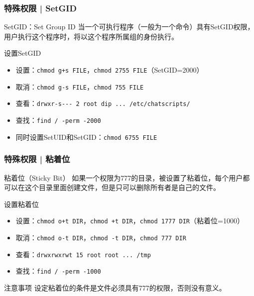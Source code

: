 \begin{frame}[fragile]
  \frametitle{特殊权限 | SetGID}
  \begin{block}{SetGID：Set Group ID}
    当一个可执行程序（一般为一个命令）具有SetGID权限，用户执行这个程序时，将以这个程序所属组的身份执行。
  \end{block}
  \pause
  \begin{block}{设置SetGID}
    \begin{itemize}
      \item 设置：\verb|chmod g+s FILE|，\verb|chmod 2755 FILE|（SetGID=2000）
      \item 取消：\verb|chmod g-s FILE|，\verb|chmod 755 FILE|
      \item 查看：\verb|drwxr-s--- 2 root dip ... /etc/chatscripts/|
      \item 查找：\verb|find / -perm -2000|
      \item 同时设置SetUID和SetGID：\verb|chmod 6755 FILE|
    \end{itemize}
  \end{block}
\end{frame}

\begin{frame}[fragile]
  \frametitle{特殊权限 | 粘着位}
  \begin{block}{粘着位（Sticky Bit）}
    如果一个权限为777的目录，被设置了粘着位，每个用户都可以在这个目录里面创建文件，但是只可以删除所有者是自己的文件。
  \end{block}
  \pause
  \begin{block}{设置粘着位}
    \begin{itemize}
      \item 设置：\verb|chmod o+t DIR|，\verb|chmod +t DIR|，\verb|chmod 1777 DIR|（粘着位=1000）
      \item 取消：\verb|chmod o-t DIR|，\verb|chmod -t DIR|，\verb|chmod 777 DIR|
      \item 查看：\verb|drwxrwxrwt 15 root root ... /tmp|
      \item 查找：\verb|find / -perm -1000|
    \end{itemize}
  \end{block}
  \pause
  \begin{block}{注意事项}
    设定粘着位的条件是文件必须具有777的权限，否则没有意义。
  \end{block}
\end{frame}

